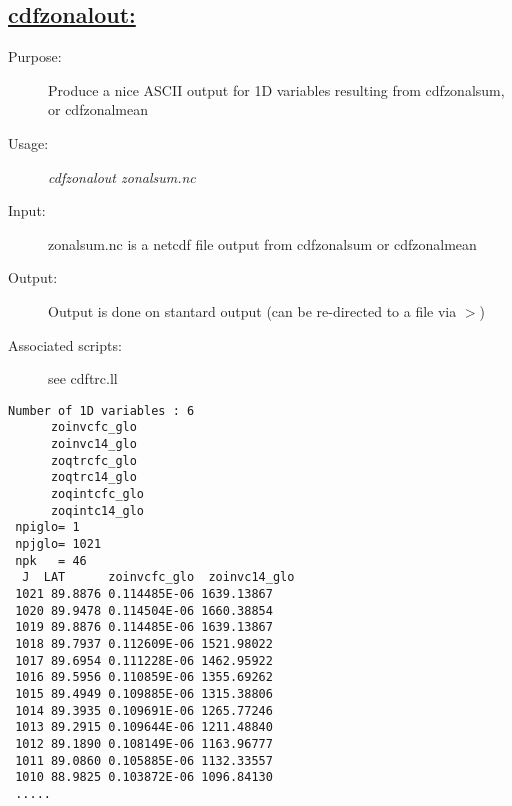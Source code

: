 \documentclass[a4paper,11pt]{article}
\begin{document}
\subsection*{\underline{cdfzonalout:}}
\begin{description}
\item[Purpose:] Produce a nice ASCII output for 1D variables resulting from cdfzonalsum, or cdfzonalmean
\item[Usage:] {\em cdfzonalout zonalsum.nc }
\item[Input:] zonalsum.nc is a netcdf file output from cdfzonalsum or cdfzonalmean
\item[Output:] Output is done on stantard output (can be re-directed to a file via $>$)
\item[Associated scripts:] {see cdftrc.ll}
\end{description}

\begin{verbatim}
Number of 1D variables : 6
      zoinvcfc_glo
      zoinvc14_glo
      zoqtrcfc_glo
      zoqtrc14_glo
      zoqintcfc_glo
      zoqintc14_glo
 npiglo= 1
 npjglo= 1021
 npk   = 46
  J  LAT      zoinvcfc_glo  zoinvc14_glo 
 1021 89.8876 0.114485E-06 1639.13867
 1020 89.9478 0.114504E-06 1660.38854
 1019 89.8876 0.114485E-06 1639.13867
 1018 89.7937 0.112609E-06 1521.98022
 1017 89.6954 0.111228E-06 1462.95922
 1016 89.5956 0.110859E-06 1355.69262
 1015 89.4949 0.109885E-06 1315.38806
 1014 89.3935 0.109691E-06 1265.77246
 1013 89.2915 0.109644E-06 1211.48840
 1012 89.1890 0.108149E-06 1163.96777
 1011 89.0860 0.105885E-06 1132.33557
 1010 88.9825 0.103872E-06 1096.84130
 .....

\end{verbatim}


\newpage
\end{document}

